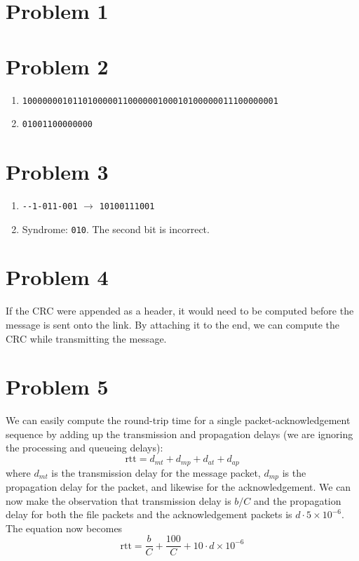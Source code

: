 \documentclass{article}
\begin{document}
\thispagestyle{fancy}
\vspace*{12pt}


\section*{Problem 1}


\section*{Problem 2}

\begin{enumerate}[label={\bf (\alph*)}]
  \item \verb=100000001011010000011000000100010100000011100000001=
  \item \verb=01001100000000=
\end{enumerate}

\section*{Problem 3}

\begin{enumerate}[label={\bf (\alph*)}]
  \item \verb=--1-011-001= $\rightarrow$ \verb=10100111001=
  \item Syndrome: \verb=010=. The second bit is incorrect.
\end{enumerate}

\section*{Problem 4}

If the CRC were appended as a header, it would need to be computed before the
message is sent onto the link. By attaching it to the end, we can compute the
CRC while transmitting the message.

\section*{Problem 5}

We can easily compute the round-trip time for a single packet-acknowledgement
sequence by adding up the transmission and propagation delays (we are ignoring
the processing and queueing delays):
\begin{equation*}
  \text{rtt} = d_{mt} + d_{mp} + d_{at} + d_{ap}
\end{equation*}
where $d_{mt}$ is the transmission delay for the message packet, $d_{mp}$ is the
propagation delay for the packet, and likewise for the acknowledgement. We can
now make the observation that transmission delay is $b/C$ and the propagation
delay for both the file packets and the acknowledgement packets
is $d\cdot5\times 10^{-6}$. The equation now becomes
\begin{equation*}
  \text{rtt} = \frac{b}{C} + \frac{100}{C} + 10\cdot d\times 10^{-6}
\end{equation*}
\end{document}
